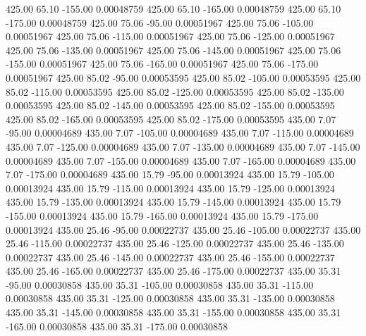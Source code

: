    425.00     65.10   -155.00     0.00048759
    425.00     65.10   -165.00     0.00048759
    425.00     65.10   -175.00     0.00048759
    425.00     75.06    -95.00     0.00051967
    425.00     75.06   -105.00     0.00051967
    425.00     75.06   -115.00     0.00051967
    425.00     75.06   -125.00     0.00051967
    425.00     75.06   -135.00     0.00051967
    425.00     75.06   -145.00     0.00051967
    425.00     75.06   -155.00     0.00051967
    425.00     75.06   -165.00     0.00051967
    425.00     75.06   -175.00     0.00051967
    425.00     85.02    -95.00     0.00053595
    425.00     85.02   -105.00     0.00053595
    425.00     85.02   -115.00     0.00053595
    425.00     85.02   -125.00     0.00053595
    425.00     85.02   -135.00     0.00053595
    425.00     85.02   -145.00     0.00053595
    425.00     85.02   -155.00     0.00053595
    425.00     85.02   -165.00     0.00053595
    425.00     85.02   -175.00     0.00053595
    435.00      7.07    -95.00     0.00004689
    435.00      7.07   -105.00     0.00004689
    435.00      7.07   -115.00     0.00004689
    435.00      7.07   -125.00     0.00004689
    435.00      7.07   -135.00     0.00004689
    435.00      7.07   -145.00     0.00004689
    435.00      7.07   -155.00     0.00004689
    435.00      7.07   -165.00     0.00004689
    435.00      7.07   -175.00     0.00004689
    435.00     15.79    -95.00     0.00013924
    435.00     15.79   -105.00     0.00013924
    435.00     15.79   -115.00     0.00013924
    435.00     15.79   -125.00     0.00013924
    435.00     15.79   -135.00     0.00013924
    435.00     15.79   -145.00     0.00013924
    435.00     15.79   -155.00     0.00013924
    435.00     15.79   -165.00     0.00013924
    435.00     15.79   -175.00     0.00013924
    435.00     25.46    -95.00     0.00022737
    435.00     25.46   -105.00     0.00022737
    435.00     25.46   -115.00     0.00022737
    435.00     25.46   -125.00     0.00022737
    435.00     25.46   -135.00     0.00022737
    435.00     25.46   -145.00     0.00022737
    435.00     25.46   -155.00     0.00022737
    435.00     25.46   -165.00     0.00022737
    435.00     25.46   -175.00     0.00022737
    435.00     35.31    -95.00     0.00030858
    435.00     35.31   -105.00     0.00030858
    435.00     35.31   -115.00     0.00030858
    435.00     35.31   -125.00     0.00030858
    435.00     35.31   -135.00     0.00030858
    435.00     35.31   -145.00     0.00030858
    435.00     35.31   -155.00     0.00030858
    435.00     35.31   -165.00     0.00030858
    435.00     35.31   -175.00     0.00030858
